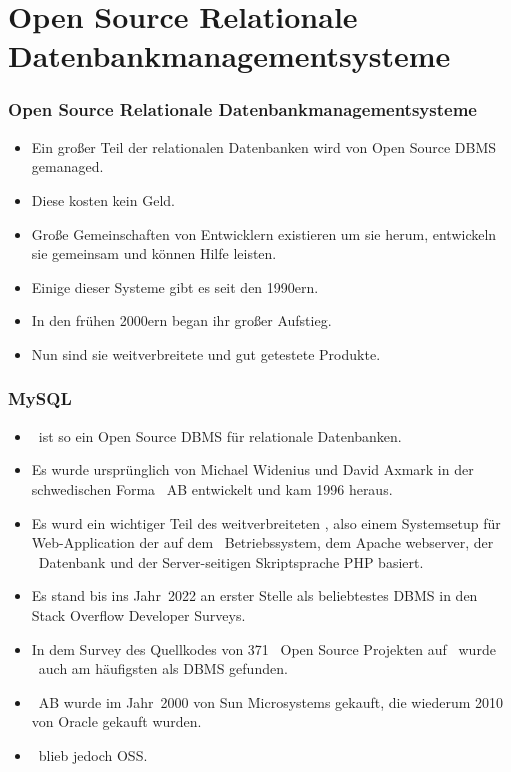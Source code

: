 \documentclass[aspectratio=169,mathserif,notheorems]{beamer}%
\begin{document}
\section{Open Source Relationale Datenbankmanagementsysteme}%
%
\begin{frame}%
\frametitle{Open Source Relationale Datenbankmanagementsysteme}%
\begin{itemize}%
\item Ein großer Teil der relationalen Datenbanken wird von Open Source DBMS gemanaged.%
\item<2-> Diese kosten kein Geld.%
\item<3-> Große Gemeinschaften von Entwicklern existieren um sie herum, entwickeln sie gemeinsam und können Hilfe leisten.%
\item<4-> Einige dieser Systeme gibt es seit den 1990ern.%
\item<5-> In den frühen 2000ern began ihr großer Aufstieg\cite{P2004OSDMITM}.%
\item<6-> Nun sind sie weitverbreitete und gut getestete Produkte\cite{C20245YOQ}.%
\end{itemize}%
\end{frame}%
%
\begin{frame}%
\frametitle{MySQL}%
\begin{itemize}%
\item \mysql\ ist so ein Open Source DBMS für relationale Datenbanken\cite{WAM2002MRMDFTS,TA2024DDAMWPAM,BT2021HPM,RGS2021BTOTONAMDFPC,D2015LMAM}.%
\item<2-> Es wurde ursprünglich von Michael Widenius und David Axmark in der schwedischen Forma \mysql~AB entwickelt und kam 1996 heraus\cite{C20245YOQ}.%
\item<3-> Es wurd ein wichtiger Teil des weitverbreiteten \lampStack, also einem Systemsetup für Web-Application der auf dem \linux\ Betriebssystem, dem Apache webserver, der \mysql\ Datenbank und der Server-seitigen Skriptsprache PHP basiert\cite{C2022HAFTLS,H2020ULU2E}.%
\item<4-> Es stand bis ins Jahr~2022 an erster Stelle als beliebtestes DBMS in den Stack Overflow Developer Surveys\cite{SE:SO:2024DS}.
\item<5-> In dem Survey\cite{PMPVEPWGSMB2025ATAODMSTTHOOSP} des Quellkodes von 371~ Open Source  Projekten auf \github\ wurde \mysql\ auch am häufigsten als DBMS gefunden.%
\item<6-> \mysql~AB wurde im Jahr~2000 von Sun Microsystems gekauft, die wiederum 2010 von Oracle gekauft wurden\cite{C20245YOQ}.%
\item<7-> \mysql\ blieb jedoch OSS.%
\end{itemize}%
\end{frame}%
\end{document}
